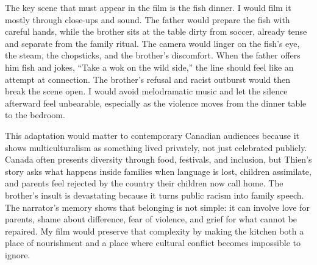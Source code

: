 \documentclass[12pt]{article}
\begin{document}
The key scene that must appear in the film is the fish dinner. I would film it mostly through close-ups and sound. The father would prepare the fish with careful hands, while the brother sits at the table dirty from soccer, already tense and separate from the family ritual. The camera would linger on the fish's eye, the steam, the chopsticks, and the brother's discomfort. When the father offers him fish and jokes, ``Take a wok on the wild side,'' the line should feel like an attempt at connection. The brother's refusal and racist outburst would then break the scene open. I would avoid melodramatic music and let the silence afterward feel unbearable, especially as the violence moves from the dinner table to the bedroom.

This adaptation would matter to contemporary Canadian audiences because it shows multiculturalism as something lived privately, not just celebrated publicly. Canada often presents diversity through food, festivals, and inclusion, but Thien's story asks what happens inside families when language is lost, children assimilate, and parents feel rejected by the country their children now call home. The brother's insult is devastating because it turns public racism into family speech. The narrator's memory shows that belonging is not simple: it can involve love for parents, shame about difference, fear of violence, and grief for what cannot be repaired. My film would preserve that complexity by making the kitchen both a place of nourishment and a place where cultural conflict becomes impossible to ignore.
\end{document}
